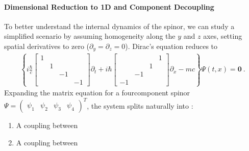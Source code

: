 \documentclass[letterpaper,10pt,english]{jupyterBook}
\begin{document}
\paragraph{Dimensional Reduction to 1D and Component Decoupling}
\label{\detokenize{ch/quantum-mechanics/relativistic-qm/dirac-equation:dimensional-reduction-to-1d-and-component-decoupling}}
\sphinxAtStartPar
To better understand the internal dynamics of the spinor, we can study a simplified scenario by assuming homogeneity along the \(y\) and \(z\) axes, setting spatial derivatives to zero (\(\partial_y = \partial_z = 0\)). Dirac’s equation reduces to
\begin{equation*}
\begin{split}
\left\{
i \frac{\hbar}{c} \begin{bmatrix} 1 & & & \\ & 1 & & \\ & & -1 & \\ & & & -1 \end{bmatrix} \partial_t
+ i \hbar \begin{bmatrix} & & & 1 \\ & & 1 & \\ & -1 & & \\ -1 & & &  \end{bmatrix} \partial_x
- m c \right\} \Psi(t, x) = \mathbf{0} \ .
\end{split}
\end{equation*}
\sphinxAtStartPar
Expanding the matrix equation for a four\sphinxhyphen{}component spinor \(\Psi = \begin{pmatrix} \psi_1 & \psi_2 & \psi_3 & \psi_4 \end{pmatrix}^T\), the system splits naturally into :
\begin{enumerate}
%
\item {} 
\sphinxAtStartPar
A coupling between 

\item {} 
\sphinxAtStartPar
A coupling between 

\end{enumerate}
\end{document}
